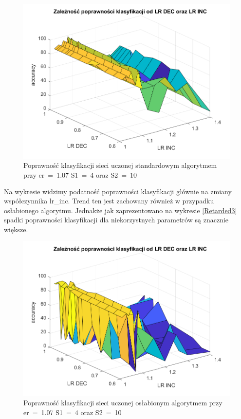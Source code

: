 \documentclass[12pt,twoside]{article}
\begin{document}
\begin{figure}[ht]
	\centering
	\includegraphics[width=16cm]{figures/Retarded_2.png}
	\caption{Poprawność klasyfikacji sieci uczonej standardowym algorytmem przy er~=~1.07 S1~=~4 oraz S2~=~10}
	\label{Fig:Retarded2}
\end{figure}
Na wykresie widzimy podatność poprawności klasyfikacji głównie na zmiany współczynnika lr\_inc.
Trend ten jest zachowany również w przypadku osłabionego algorytmu.
Jednakże jak zaprezentowano na wykresie \ref{Retarded3} spadki poprawności klasyfikacji dla niekorzystnych parametrów są znacznie większe.

\begin{figure}[ht]
	\centering
	\includegraphics[width=16cm]{figures/Retarded_3.png}
	\caption{Poprawność klasyfikacji sieci uczonej osłabionym algorytmem przy er~=~1.07 S1~=~4 oraz S2~=~10}
	\label{Fig:Retarded3}
\end{figure}
\end{document}
